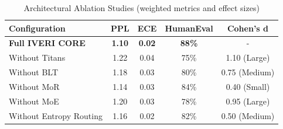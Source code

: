 \begin{table}[h]
\centering
\begin{tabular}{lcccc}
\hline
\textbf{Configuration} & \textbf{PPL} & \textbf{ECE} & \textbf{HumanEval} & \textbf{Cohen's d} \\ \hline
\textbf{Full IVERI CORE} & \textbf{1.10} & \textbf{0.02} & \textbf{88\%} & - \\
Without Titans & 1.22 & 0.04 & 75\% & 1.10 (Large) \\
Without BLT & 1.18 & 0.03 & 80\% & 0.75 (Medium) \\
Without MoR & 1.14 & 0.03 & 84\% & 0.40 (Small) \\
Without MoE & 1.20 & 0.03 & 78\% & 0.95 (Large) \\
Without Entropy Routing & 1.16 & 0.02 & 82\% & 0.50 (Medium) \\ \hline
\end{tabular}
\caption{Architectural Ablation Studies (weighted metrics and effect sizes)}
\label{tab:ablations}
\end{table}
